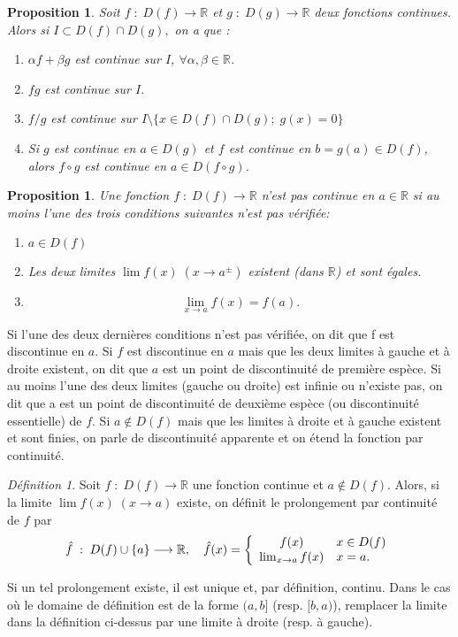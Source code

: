 \documentclass[oneside,12pt,french,table]{book}
\theoremstyle{definition}
\theoremstyle{plain}
\newtheorem{proposition}[definition]{Proposition}
\theoremstyle{remark}
\newtheorem{defi}[definition]{Définition}
\newcommand{\Rr}{{\mathbb{R}}}
\begin{document}
\begin{proposition}
    Soit  $f\;:\;D(f)\longrightarrow\Rr$  et $g\;:\;D(g)\longrightarrow\Rr$ deux fonctions continues.
    Alors si $I\subset D(f) \cap D(g),$ on a que :
    \begin{enumerate}
        \item $\alpha f+\beta g$ est continue sur $I$, $\forall \alpha, \beta \in\Rr$.
        \item $fg$ est continue sur $I$.
        \item $f/g$ est continue sur $I\setminus\{x\in D(f)\cap D(g); \;g(x)=0\}$
        \item Si $g$ est continue en $a\in D(g)$ et $f$ est continue en $b=g(a)\in D(f)$, alors $f\circ g$ est continue en $a\in D(f\circ g)$.
    \end{enumerate}
\end{proposition}
\begin{proposition}
    Une fonction $f\;:\;D(f)\longrightarrow\Rr$ n'est pas continue en $a\in\Rr$ si au moins l'une des trois conditions suivantes n'est pas vérifiée:
    \begin{enumerate}
        \item $a\in D(f)$
        \item  Les deux limites $\lim f(x)\; (x\rightarrow a^{\pm})$ existent (dans $\Rr$) et sont égales.
        \item \[
        \lim_{x\rightarrow a}f(x)=f(a).
        \]
    \end{enumerate}
\end{proposition}
Si l'une des deux dernières conditions n'est pas vérifiée, on dit que f est discontinue en $a$. Si $f$ est discontinue en $a$ mais que les deux limites à gauche et à droite existent, on dit que $a$ est un point de discontinuité de première espèce. Si au moins l'une des deux limites (gauche ou droite) est infinie ou n'existe pas, on dit que a est un point de discontinuité de deuxième espèce (ou discontinuité essentielle) de $f$. Si $a\not\in D(f)$ mais que les limites à droite et à gauche existent et sont finies, on parle de discontinuité apparente et on étend la fonction par continuité.

\begin{defi}
    Soit $f\;:\;D(f)\longrightarrow\Rr$ une fonction continue et $a\not\in D(f)$.
    Alors, si la limite $\lim f(x) \; (x\rightarrow a)$ existe, on définit le prolongement par continuité de $f$ par \[
    \hat{f} \;:\; D(f)\cup \{a\} \longrightarrow\Rr, \quad \hat{f}(x)=
     \left \{
   \begin{array}{c l}
      f(x) & x\in D(f)\\
      \lim_{x\rightarrow a}f(x) & x=a. 
   \end{array}
   \right .
    \]
\end{defi}
Si un tel prolongement existe, il est unique et, par définition, continu. Dans le cas où le domaine de définition est de la forme $(a,b]$ (resp. $[b,a)$), remplacer la limite dans la définition ci-dessus par une limite à droite (resp. à gauche).
\end{document}
